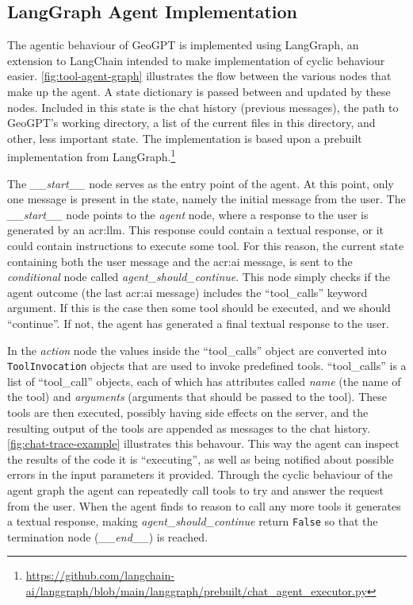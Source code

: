 \subsection{LangGraph Agent Implementation}
\label{subsec:lg-agent-implementation}

The agentic behaviour of GeoGPT is implemented using LangGraph, an extension to LangChain intended to make implementation of cyclic behaviour easier. \autoref{fig:tool-agent-graph} illustrates the flow between the various nodes that make up the agent. A state dictionary is passed between and updated by these nodes. Included in this state is the chat history (previous messages), the path to GeoGPT's working directory, a list of the current files in this directory, and other, less important state. The implementation is based upon a prebuilt implementation from LangGraph.\footnote{\url{https://github.com/langchain-ai/langgraph/blob/main/langgraph/prebuilt/chat_agent_executor.py}}

The \textit{\_\_start\_\_} node serves as the entry point of the agent. At this point, only one message is present in the state, namely the initial message from the user. The \textit{\_\_start\_\_} node points to the \textit{agent} node, where a response to the user is generated by an \acrshort{acr:llm}. This response could contain a textual response, or it could contain instructions to execute some tool. For this reason, the current state containing both the user message and the \acrshort{acr:ai} message, is sent to the \textit{conditional} node called \textit{agent\_should\_continue}. This node simply checks if the agent outcome (the last \acrshort{acr:ai} message) includes the \enquote{tool\_calls} keyword argument. If this is the case then some tool should be executed, and we should \enquote{continue}. If not, the agent has generated a final textual response to the user.

In the \textit{action} node the values inside the \enquote{tool\_calls} object are converted into \texttt{ToolInvocation} objects that are used to invoke predefined tools. \enquote{tool\_calls} is a list of \enquote{tool\_call} objects, each of which has attributes called \textit{name} (the name of the tool) and \textit{arguments} (arguments that should be passed to the tool). These tools are then executed, possibly having side effects on the server, and the resulting output of the tools are appended as messages to the chat history. \autoref{fig:chat-trace-example} illustrates this behavour. This way the agent can inspect the results of the code it is \enquote{executing}, as well as being notified about possible errors in the input parameters it provided. Through the cyclic behaviour of the agent graph the agent can repeatedly call tools to try and answer the request from the user. When the agent finds to reason to call any more tools it generates a textual response, making \textit{agent\_should\_continue} return \texttt{False} so that the termination node (\textit{\_\_end\_\_}) is reached.

